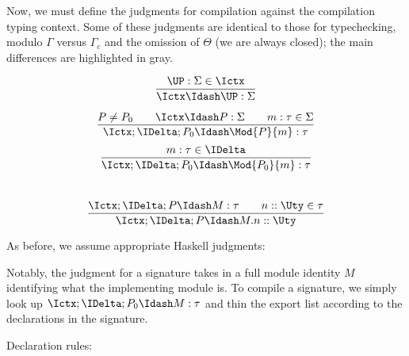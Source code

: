 Now, we must define the judgments for compilation against the compilation
typing context.  Some of these judgments are identical to those for
typechecking, modulo $\Gamma$ versus $\Gamma_c$ and the omission
of $\Theta$ (we are always closed); the main differences
are highlighted in gray. \\

\fbox{$\Ictx \Idash \UP : \Sigma$}
\begin{greybox}
\[
\frac{
\UP : \Sigma \in \Ictx
}{
\Ictx \Idash \UP : \Sigma
}
\]
\end{greybox}

\[
\frac{
P \neq P_0 \qquad
\Ictx \Idash P : \Sigma \qquad
m : \tau \in \Sigma
}{
\Ictx; \IDelta; P_0 \Idash \Mod{P}{m} : \tau
}
\]
\[
\frac{
m : \tau \in \IDelta
}{
\Ictx; \IDelta; P_0 \Idash \Mod{P_0}{m} : \tau
}
\]
\\

\[
\frac{
\Ictx; \IDelta; P \Idash M : \tau \qquad
n :: \Uty \in \tau
}{
\Ictx; \IDelta; P \Idash M.n :: \Uty
}
\]

As before, we assume appropriate Haskell judgments: \\


\begin{greybox}
\end{greybox}

Notably, the judgment for a signature takes in a full module identity
$M$ identifying what the implementing module is.  To compile a
signature, we simply look up $\Ictx; \IDelta; P_0 \Idash M : \tau$ and
thin the export list according to the declarations in the signature.

Declaration rules: \\


